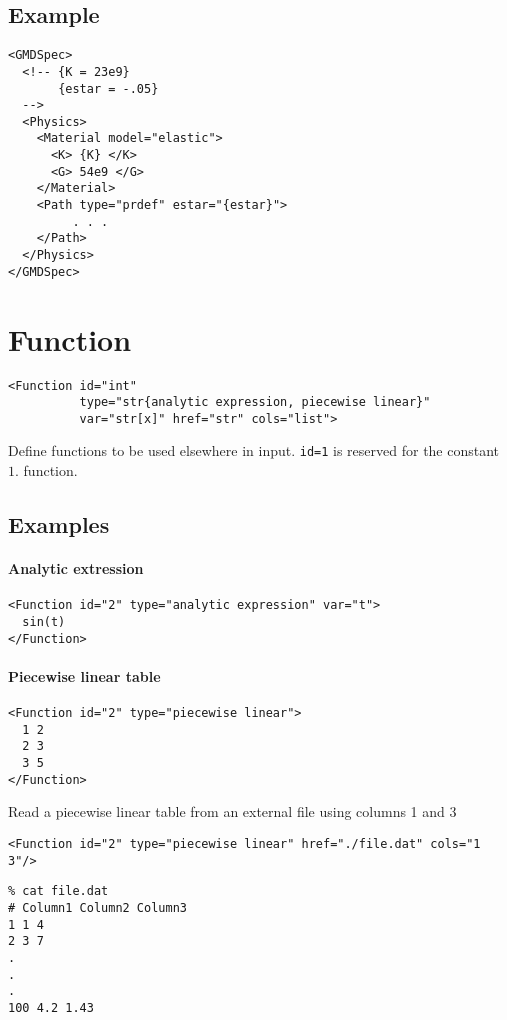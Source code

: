 \documentclass[11pt]{report}
\begin{document}
\subsection{Example}
\begin{verbatim}
<GMDSpec>
  <!-- {K = 23e9}
       {estar = -.05}
  -->
  <Physics>
    <Material model="elastic">
      <K> {K} </K>
      <G> 54e9 </G>
    </Material>
    <Path type="prdef" estar="{estar}">
         . . .
    </Path>
  </Physics>
</GMDSpec>
\end{verbatim}

\section{Function}
\begin{verbatim}
<Function id="int"
          type="str{analytic expression, piecewise linear}"
          var="str[x]" href="str" cols="list">
\end{verbatim}
%
Define functions to be used elsewhere in input. \texttt{id=1} is
reserved for the constant $1.$ function.

\subsection{Examples}
\paragraph{Analytic extression}
%
\begin{verbatim}
<Function id="2" type="analytic expression" var="t">
  sin(t)
</Function>
\end{verbatim}

\paragraph{Piecewise linear table}
%
\begin{verbatim}
<Function id="2" type="piecewise linear">
  1 2
  2 3
  3 5
</Function>
\end{verbatim}
%
Read a piecewise linear table from an external file using columns 1 and 3
%
\begin{verbatim}
<Function id="2" type="piecewise linear" href="./file.dat" cols="1 3"/>
\end{verbatim}

\begin{verbatim}
% cat file.dat
# Column1 Column2 Column3
1 1 4
2 3 7
.
.
.
100 4.2 1.43
\end{verbatim}
\end{document}
